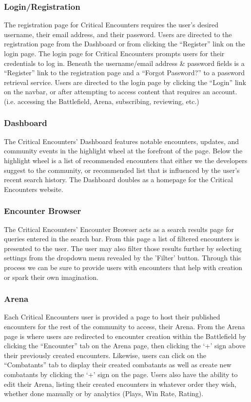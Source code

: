 \documentclass[letterpaper, 10 pt, conference]{ieeeconf}
\begin{document}
\subsubsection{Login/Registration}
The registration page for Critical Encounters requires the user’s
desired username, their email address, and their password. Users are directed to
the registration page from the Dashboard or from clicking the “Register” link on
the login page. The login page for Critical Encounters prompts users for their
credentials to log in. Beneath the username/email address \& password fields is a
“Register” link to the registration page and a “Forgot Password?” to a password
retrieval service. Users are directed to the login page by clicking the “Login” link
on the navbar, or after attempting to access content that requires an account. (i.e.
accessing the Battlefield, Arena, subscribing, reviewing, etc.)
\subsubsection{Dashboard}
The Critical Encounters’ Dashboard features notable encounters,
updates, and community events in the highlight wheel at the forefront of the page.
Below the highlight wheel is a list of recommended encounters that either we the
developers suggest to the community, or recommended list that is influenced by
the user’s recent search history.
The Dashboard doubles as a homepage for the Critical Encounters website.
\subsubsection{Encounter Browser}
The Critical Encounters’ Encounter Browser acts as a search results
page for queries entered in the search bar. From this page a list of filtered
encounters is presented to the user. The user may also filter those results further
by selecting settings from the dropdown menu revealed by the ’Filter’ button.
Through this process we can be sure to provide users with encounters that help
with creation or spark their own imagination.
\subsubsection{Arena}
Each Critical Encounters user is provided a page to host their published encounters
for the rest of the community to access, their Arena. From the Arena
page is where users are redirected to encounter creation within the
Battlefield by clicking the “Encounter” tab on the Arena page, then clicking the
‘+’ sign above their previously created encounters. Likewise, users can click on
the “Combatants” tab to display their created combatants as well as create new
combatants by clicking the ‘+’ sign on the page. Users also have the ability to edit
their Arena, listing their created encounters in whatever order they wish, whether
done manually or by analytics (Plays, Win Rate, Rating).
\end{document}
